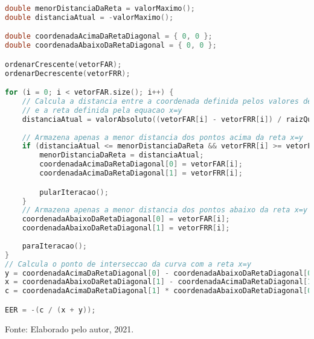 \begin{lstlisting}[language=C++, caption={Algoritmo para o cálculo do EER}, captionpos=t, label={lst:EERAlgo}, belowskip=-4 \baselineskip]
double menorDistanciaDaReta = valorMaximo();
double distanciaAtual = -valorMaximo();

double coordenadaAcimaDaRetaDiagonal = { 0, 0 };
double coordenadaAbaixoDaRetaDiagonal = { 0, 0 };

ordenarCrescente(vetorFAR);
ordenarDecrescente(vetorFRR);

for (i = 0; i < vetorFAR.size(); i++) {
	// Calcula a distancia entre a coordenada definida pelos valores de FAR e FRR
	// e a reta definida pela equacao x=y
	distanciaAtual = valorAbsoluto((vetorFAR[i] - vetorFRR[i]) / raizQuadrada(2));
	
	// Armazena apenas a menor distancia dos pontos acima da reta x=y
	if (distanciaAtual <= menorDistanciaDaReta && vetorFRR[i] >= vetorFAR[i]) {
		menorDistanciaDaReta = distanciaAtual;
		coordenadaAcimaDaRetaDiagonal[0] = vetorFAR[i];
		coordenadaAcimaDaRetaDiagonal[1] = vetorFRR[i];

		pularIteracao();
	}
	// Armazena apenas a menor distancia dos pontos abaixo da reta x=y
	coordenadaAbaixoDaRetaDiagonal[0] = vetorFAR[i];
	coordenadaAbaixoDaRetaDiagonal[1] = vetorFRR[i];
	
	paraIteracao();
}
// Calcula o ponto de interseccao da curva com a reta x=y
y = coordenadaAcimaDaRetaDiagonal[0] - coordenadaAbaixoDaRetaDiagonal[0] - 1;
x = coordenadaAbaixoDaRetaDiagonal[1] - coordenadaAcimaDaRetaDiagonal[1] + 1;
c = coordenadaAcimaDaRetaDiagonal[1] * coordenadaAbaixoDaRetaDiagonal[0] - coordenadaAcimaDaRetaDiagonal[0] * coordenadaAbaixoDaRetaDiagonal[1];

EER = -(c / (x + y));
\end{lstlisting}
\begin{center}
	\par Fonte: Elaborado pelo autor, 2021.
\end{center}